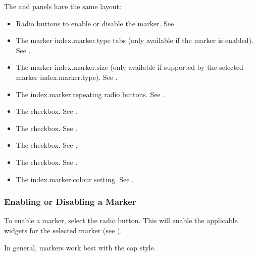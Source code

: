 The  and  panels have
the same layout:
\begin{itemize}
\item Radio buttons to enable or disable the marker.
See .

\item The marker \gls{index.marker.type} tabs (only available if the marker is
enabled). See .

\item The marker \gls{index.marker.size} (only available if
supported by the selected marker \gls{index.marker.type}).
See .

\item The \gls{index.marker.repeating} radio buttons.
See .

\item The  checkbox.
See . 

\item The  checkbox.
See .

\item The  checkbox.
See .

\item The  checkbox.
See .

\item The \gls{index.marker.colour} setting.
See .

\end{itemize}

\subsubsection{Enabling or Disabling a Marker}\label{sec:enablingmarkers}


To enable a marker, select the 
radio button. This will enable the applicable widgets for the
selected marker (see ).

\begin{information}
In general, markers work best with the  cap
style.
\end{information}

